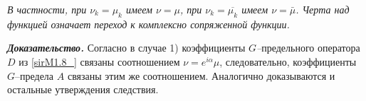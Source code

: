 \textit{В частности, при $\nu _{k} =\mu _{k} $ имеем $\nu =\mu $, при $\nu _{k} =\overline{\mu _{k} }$ имеем $\nu =\bar{\mu }$. Черта над функцией означает переход к комплексно сопряженной функции.}

\textbf{\textit{Доказательство.}}  Согласно \cite{Sirazh3} в случае 1) коэффициенты \textit{$G$--}предельного оператора \textit{$D$ }из \eqref{sirM1.8_} связаны соотношением \textit{$\nu =e^{i\alpha } \mu $}, следовательно, коэффициенты \textit{$G$}--предела \textit{$A$} связаны этим же соотношением. Аналогично доказываются и остальные утверждения следствия.
